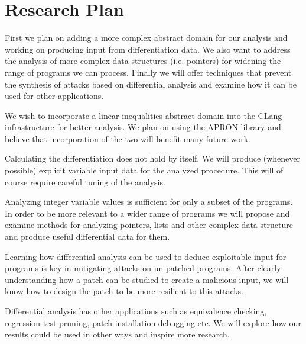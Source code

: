\section{Research Plan}

First we plan on adding a more complex abstract domain for our analysis and working on producing input from differentiation data. We also want to address the analysis of more complex data structures (i.e. pointers) for widening the range of programs we can process. Finally we will offer techniques that prevent the synthesis of attacks based on differential analysis and examine how it can be used for other applications.

 We wish to incorporate a linear inequalities abstract domain into the CLang \cite{CLang} infrastructure for better analysis. We plan on using the APRON \cite{DBLP:conf/cav/JeannetM09} library and believe that incorporation of the two will benefit many future work.

 Calculating the differentiation does not hold by itself. We will produce (whenever possible) explicit variable input data for the analyzed procedure. This will of course require careful tuning of the analysis.

 Analyzing integer variable values is sufficient for only a subset of the programs. In order to be more relevant to a wider range of programs we will propose and examine methods for analyzing pointers, lists and other complex data structure and produce useful differential data for them.

 Learning how differential analysis can be used to deduce exploitable input for programs is key in mitigating attacks on un-patched programs. After clearly understanding how a patch can be studied to create a malicious input, we will know how to design the patch to be more resilient to this attacks.

 Differential analysis has other applications such as equivalence checking, regression test pruning, patch installation debugging etc. We will explore how our results could be used in other ways and inspire more research.
